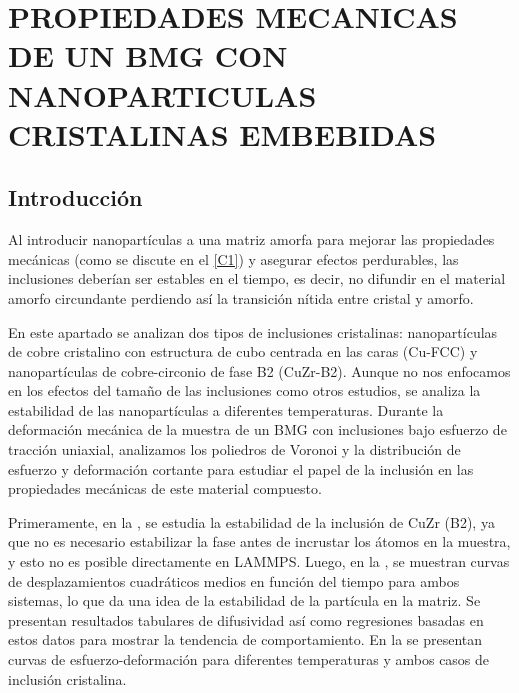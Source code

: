
\chapter{PROPIEDADES MECANICAS DE UN BMG CON NANOPARTICULAS CRISTALINAS EMBEBIDAS} %

\label{C4} %


\section{Introducción}
Al introducir nanopartículas a una matriz amorfa para mejorar las propiedades mecánicas (como se discute en el \cref{C1}) y asegurar efectos perdurables, las inclusiones deberían ser estables en el tiempo, es decir, no difundir en el material amorfo circundante perdiendo así la transición nítida entre cristal y amorfo.

En este apartado se analizan dos tipos de inclusiones cristalinas: nanopartículas de cobre cristalino con estructura de cubo centrada en las caras (Cu-FCC) y nanopartículas de cobre-circonio de fase B2 (CuZr-B2). Aunque no nos enfocamos en los efectos del tamaño de las inclusiones como otros estudios, se analiza la estabilidad de las nanopartículas a diferentes temperaturas. Durante la deformación mecánica de la muestra de un BMG con inclusiones bajo esfuerzo de tracción uniaxial, analizamos los poliedros de Voronoi y la distribución de esfuerzo y deformación cortante para estudiar el papel de la inclusión en las propiedades mecánicas de este material compuesto.

Primeramente, en la , se estudia la estabilidad de la inclusión de CuZr (B2), ya que no es necesario estabilizar la fase antes de incrustar los átomos en la muestra, y esto no es posible directamente en LAMMPS. Luego, en la , se muestran curvas de desplazamientos cuadráticos medios en función del tiempo para ambos sistemas, lo que da una idea de la estabilidad de la partícula en la matriz. Se presentan resultados tabulares de difusividad así como regresiones basadas en estos datos para mostrar la tendencia de comportamiento. En la  se presentan curvas de esfuerzo-deformación para diferentes temperaturas y ambos casos de inclusión cristalina.

